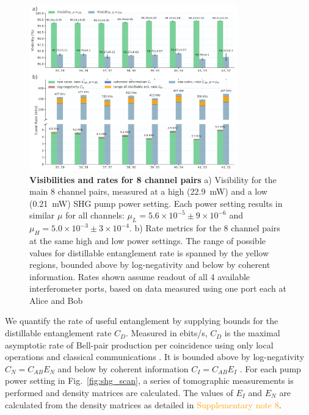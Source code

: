\documentclass[11pt]{caltech_thesis} %
\begin{document}
\hypertarget{fig:channel_data}{%
\begin{figure}
\centering
\includegraphics[width=0.8\textwidth,height=\textheight]{./chapter_05/figs/8ch_bar_graph_high_power_light.pdf}
\caption[{Visibilities and rates for 8 channel pairs}]{\textbf{Visibilities and rates for 8 channel pairs} a) Visibility for the main 8 channel pairs, measured at a high (22.9~mW) and a low (0.21~mW) SHG pump power setting. Each power setting results in similar $\mu$ for all channels: $\mu_L = 5.6{\times}10^{-5} \pm 9{\times}10^{-6}$ and $\mu_H = 5.0{\times}10^{-3} \pm 3{\times}10^{-4}$. b) Rate metrics for the 8 channel pairs at the same high and low power settings. The range of possible values for distillable entanglement rate is spanned by the yellow regions, bounded above by log-negativity and below by coherent information. Rates shown assume readout of all 4 available interferometer ports, based on data measured using one port each at Alice and Bob}
\label{fig:channel_data}
\end{figure}
}

We quantify the rate of useful entanglement by supplying bounds for the distillable entanglement rate $C_D$. Measured in ebits/s, $C_D$ is the maximal asymptotic rate of Bell-pair production per coincidence using only local operations and classical communications \autocite{Alshowkan2022,Bennett1996}. It is bounded above by log-negativity $C_N = C_{AB} E_N$ and below by coherent information $C_I = C_{AB} E_I$ \autocite{Alshowkan2022}. For each pump power setting in Fig.~\ref{fig:shg_scan}, a series of tomographic measurements is performed and density matrices are calculated. The values of $E_I$ and $E_N$ are calculated from the density matrices as detailed in \textcolor{orange}{Supplementary note 8}.
\end{document}
